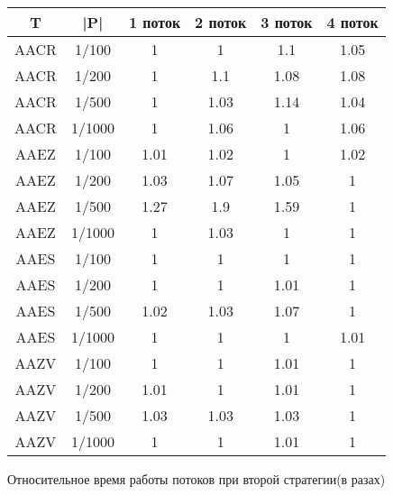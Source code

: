 \documentclass[14pt]{article}
\begin{document}
\begin{figure}
\begin{center}
\begin{tabular}{ | c | c | c | c | c | c |}
        \hline T & |P| & 1 поток & 2 поток & 3 поток & 4 поток\\
        \hline AACR & 1/100 & 1 & 1 & 1.1 & 1.05\\
        \hline AACR & 1/200 & 1 & 1.1 & 1.08 & 1.08 \\
        \hline AACR & 1/500 & 1 & 1.03 & 1.14 & 1.04 \\
 		\hline AACR & 1/1000 & 1 & 1.06 & 1 & 1.06 \\
              
        \hline AAEZ & 1/100 & 1.01 & 1.02 & 1 & 1.02\\
        \hline AAEZ & 1/200 & 1.03 & 1.07 & 1.05 & 1 \\
        \hline AAEZ & 1/500 & 1.27 & 1.9 & 1.59 & 1 \\
        \hline AAEZ & 1/1000 & 1 & 1.03 & 1 & 1 \\
        
  		\hline AAES & 1/100 & 1 & 1 & 1 & 1 \\
        \hline AAES & 1/200 & 1 & 1 & 1.01 & 1 \\
        \hline AAES & 1/500 & 1.02 & 1.03 & 1.07 & 1 \\
        \hline AAES & 1/1000 & 1 & 1 & 1 & 1.01 \\
     
  		\hline AAZV & 1/100 & 1 & 1 & 1.01 & 1\\
        \hline AAZV & 1/200 & 1.01 & 1 & 1.01 & 1\\
        \hline AAZV & 1/500 & 1.03 & 1.03 & 1.03 & 1 \\
        \hline AAZV & 1/1000 & 1 & 1 & 1.01 & 1 \\
     
		\hline
    \end{tabular}
        \end{center}

    \caption{Относительное время работы потоков при второй стратегии(в разах)}
    \label{typical_research}
\end{figure}
\end{document}
